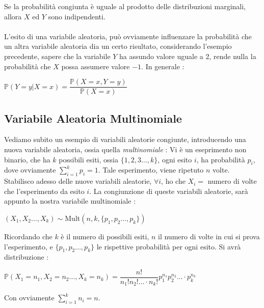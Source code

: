 \documentclass[12pt, letterpaper]{article}
\newcommand{\acc}{\\\hphantom{}\\}
\newcommand{\Prob}{{\mathbb P}}
\begin{document}
Se la probabilità congiunta è uguale al prodotto delle distribuzioni marginali, allora \(X\) ed \(Y\) 
sono indipendenti. \acc L'esito di una variabile aleatoria, può ovviamente influenzare la probabilità che un altra 
variabile aleatoria dia un certo risultato, considerando l'esempio precedente, sapere che la variabile 
\(Y\) ha assundo valore uguale a 2, rende nulla la probabilità che \(X\) possa assumere valore \(-1\). 
In generale :\begin{center}
    \(\Prob(Y=y|X=x)=\dfrac{\Prob(X=x,Y=y)}{\Prob(X=x)}\)
\end{center}
\subsection{Variabile Aleatoria Multinomiale}
Vediamo subito un esempio di variabili aleatorie congiunte, introducendo una nuova variabile 
aleatoria, ossia quella \textit{multinomiale} : Vi è un eseprimento non binario, che 
ha \(k\) possibili esiti, ossia \(\{1,2,3\dots,k\}\), ogni esito \(i\), ha probabilità \(p_i\), dove 
ovviamente \(\displaystyle\sum_{i=1}^kp_i=1\). Tale esperimento, viene ripetuto \(n\) volte. Stabilisco 
adesso delle nuove variabili aleatorie, \(\forall i\), ho che \(X_i=\) numero di volte che l'esperimento 
da esito \(i\). La congiunzione di queste variabili aleatorie, sarà appunto la nostra variabile multinomiale : \begin{center}
    \((X_1,X_2\dots,X_k)\sim\)Mult\((n,k,\{p_1,p_2\dots,p_k\})\)
\end{center} 
Ricordando che \(k\) è il numero di possibili esiti, \(n\) il numero di volte in cui si prova l'esperimento, e 
\(\{p_1,p_2\dots,p_k\}\) le rispettive probabilità per ogni esito. Si avrà distribuzione : \begin{center}
    \(\Prob(X_1=n_1,X_2=n_2\dots,X_k=n_k)=\dfrac{n!}{n_1!n_2!\dots\cdot n_k!} p_1^{n_1} p_2^{n_2}...\cdot p_k^{n_k}\)
\end{center}
Con ovviamente \(\displaystyle \sum_{i=1}^kn_i=n\).
\end{document}
